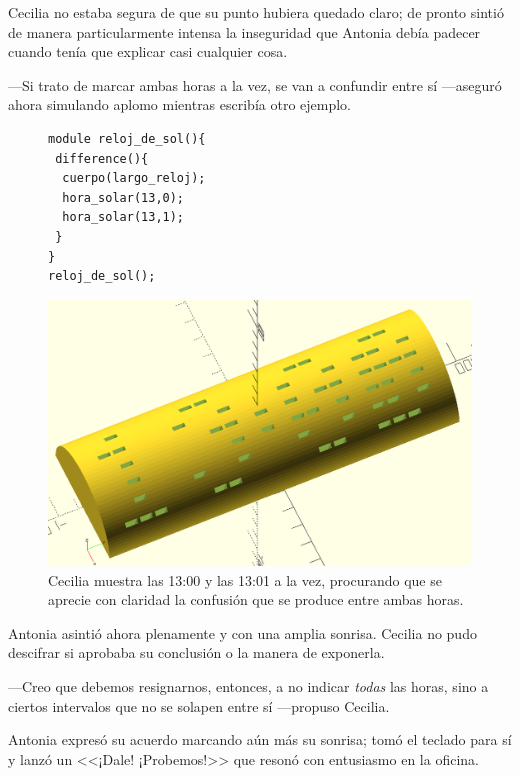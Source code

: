 Cecilia no estaba segura de que su punto hubiera quedado claro; de
pronto sintió de manera particularmente intensa la inseguridad que
Antonia debía padecer cuando tenía que explicar casi cualquier cosa.

---Si trato de marcar ambas horas a la vez, se van a confundir entre
sí ---aseguró ahora simulando aplomo mientras escribía otro ejemplo.


\begin{figure}[ht]
  \begin{minipage}[]{.45\textwidth}
\begin{lstlisting}
module reloj_de_sol(){
 difference(){
  cuerpo(largo_reloj);
  hora_solar(13,0);
  hora_solar(13,1);
 }
}
reloj_de_sol();
\end{lstlisting}%
  \end{minipage}\hfill
  \begin{minipage}[]{.52\textwidth}
    \centering
  \includegraphics[width=1\textwidth]{imagenes/13_00_01}   
  \end{minipage}
  \caption{Cecilia muestra las 13:00 y las 13:01 a la vez, procurando
    que se aprecie con claridad la confusión que se produce entre
    ambas horas.}
  \label{fig:13_00_01}
\end{figure}


Antonia asintió ahora plenamente y con una amplia sonrisa. Cecilia no
pudo descifrar si aprobaba su conclusión o la manera de exponerla.

---Creo que debemos resignarnos, entonces, a no indicar \emph{todas}
las horas, sino a ciertos intervalos que no se solapen entre sí
---pro\-pu\-so Cecilia.

Antonia expresó su acuerdo marcando aún más su sonrisa; tomó el
teclado para sí y lanzó un <<¡Dale! ¡Probemos!>> que resonó con
entusiasmo en la oficina.

